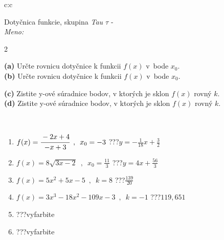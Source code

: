 \documentclass[10pt]{report}
\begin{document}
\begin{tabular}{c:c}
\begin{minipage}[c][104.5mm][t]{0.5\linewidth}
\begin{center}
\vspace{7mm}
{\huge Dotyčnica funkcie, skupina \textit{Tau $\tau$} -}\\[5mm]
\textit{Meno:}\phantom{xxxxxxxxxxxxxxxxxxxxxxxxxxxxxxxxxxxxxxxxxxxxxxxxxxxxxxxxxxxxxxxxx}\\[5mm]
\begin{minipage}{0.95\linewidth}
\begin{center}
{\small \begin{multicols}{2} \raggedright
\textbf{(a)} Určte rovnicu dotyčnice k funkcii \(f(x)\) v~bode \(x_0\). \\[1mm]
\textbf{(b)} Určte rovnicu dotyčnice k funkcii \(f(x)\) v~bode \(x_0\). \par \columnbreak
\textbf{(c)} Zistite y-ové súradnice bodov, v ktorých je sklon \(f(x)\) rovný \(k\). \\[1mm]
\textbf{(d)} Zistite y-ové súradnice bodov, v ktorých je sklon \(f(x)\) rovný \(k\). \\[1mm]
\end{multicols}
}
\end{center}
\end{minipage}
\\[4mm]
\begin{minipage}{0.79\linewidth}
\begin{center}
\begin{varwidth}{\linewidth}
\begin{enumerate}
\normalsizerr
\item $f(x)=\cfrac{-2x+4}{-x+3}\enspace , \enspace x_0=-3$\quad \dotfill\; ???\;\dotfill \quad $y = -\frac{1}{18}x+\frac{3}{2}$
\item $f(x)=8\sqrt{3x-2}\enspace , \enspace x_0=\frac{11}{3}$\quad \dotfill\; ???\;\dotfill \quad $y = 4x+\frac{56}{3}$
\item $f(x)=5x^2+5x-5\enspace , \enspace k=8$\quad \dotfill\; ???\;\dotfill \quad $\frac{139}{20}$
\item $f(x)=3x^3-18x^2-109x-3\enspace , \enspace k=-1$\quad \dotfill\; ???\;\dotfill \quad $119 , 651$
\item \quad \dotfill\; ???\;\dotfill \quad vyfarbite
\item \quad \dotfill\; ???\;\dotfill \quad vyfarbite
\end{enumerate}
\end{varwidth}

\end{center}
\end{minipage}
\end{center}
\end{minipage}
\end{tabular}
\end{document}
